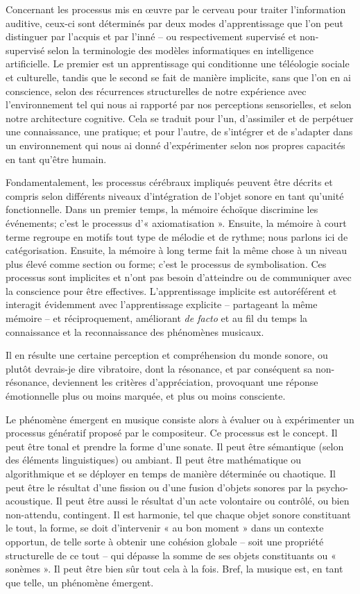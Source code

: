 \documentclass{article}
\begin{document}
Concernant les processus mis en œuvre par le cerveau pour traiter l'information auditive, ceux-ci sont déterminés par deux modes d'apprentissage que l'on peut distinguer par l'acquis et par l'inné -- ou respectivement supervisé et non-supervisé selon la terminologie des modèles informatiques en intelligence artificielle. Le premier est un apprentissage qui conditionne une téléologie sociale et culturelle, tandis que le second se fait de manière implicite, sans que l'on en ai conscience, selon des récurrences structurelles de notre expérience avec l'environnement tel qui nous ai rapporté par nos perceptions sensorielles, et selon notre architecture cognitive. Cela se traduit pour l'un, d'assimiler et de perpétuer une connaissance, une pratique; et pour l'autre, de s'intégrer et de s'adapter dans un environnement qui nous ai donné d'expérimenter selon nos propres capacités en tant qu'être humain.

Fondamentalement, les processus cérébraux impliqués peuvent être décrits et compris selon différents niveaux d'intégration de l'objet sonore en tant qu'unité fonctionnelle. Dans un premier temps, la mémoire échoïque discrimine les événements; c'est le processus d'« axiomatisation ». Ensuite, la mémoire à court terme regroupe en motifs tout type de mélodie et de rythme; nous parlons ici de catégorisation. Ensuite, la mémoire à long terme fait la même chose à un niveau plus élevé comme section ou forme; c'est le processus de symbolisation. Ces processus sont implicites et n'ont pas besoin d'atteindre ou de communiquer avec la conscience pour être effectives. L'apprentissage implicite est autoréférent et interagit évidemment avec l'apprentissage explicite -- partageant la même mémoire -- et réciproquement, améliorant \textit{de facto} et au fil du temps la connaissance et la reconnaissance des phénomènes musicaux.

Il en résulte une certaine perception et compréhension du monde sonore, ou plutôt devrais-je dire vibratoire, dont la résonance, et par conséquent sa non-résonance, deviennent les critères d'appréciation, provoquant une réponse émotionnelle plus ou moins marquée, et plus ou moins consciente.

\bigskip

Le phénomène émergent en musique consiste alors à évaluer ou à expérimenter un processus génératif proposé par le compositeur. Ce processus est le concept. Il peut être tonal et prendre la forme d'une sonate. Il peut être sémantique (selon des éléments linguistiques) ou ambiant. Il peut être mathématique ou algorithmique et se déployer en temps de manière déterminée ou chaotique. Il peut être le résultat d'une fission ou d'une fusion d'objets sonores par la psycho-acoustique. Il peut être aussi le résultat d'un acte volontaire ou contrôlé, ou bien non-attendu, contingent. Il est harmonie, tel que chaque objet sonore constituant le tout, la forme, se doit d'intervenir « au bon moment » dans un contexte opportun, de telle sorte à obtenir une cohésion globale -- soit une propriété structurelle de ce tout -- qui dépasse la somme de ses objets constituants ou « sonèmes ». Il peut être bien sûr tout cela à la fois. Bref, la musique est, en tant que telle, un phénomène émergent.
\end{document}
